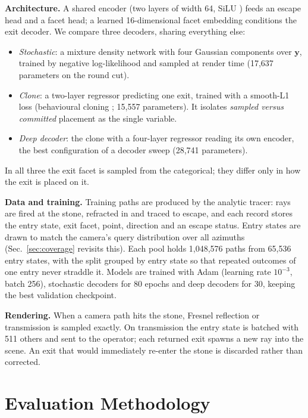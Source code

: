 \documentclass[conference]{IEEEtran}
\begin{document}
\textbf{Architecture.} A shared encoder (two layers of width 64, SiLU
\cite{elfwing2018}) feeds an escape head and a facet head; a learned
16-dimensional facet embedding conditions the exit decoder. We compare three
decoders, sharing everything else:
\begin{itemize}
\item \emph{Stochastic}: a mixture density network \cite{bishop1994} with four
Gaussian components over $\mathbf{y}$, trained by negative log-likelihood and
sampled at render time (17,637 parameters on the round cut).
\item \emph{Clone}: a two-layer regressor predicting one exit, trained with a
smooth-L1 loss (behavioural cloning \cite{pomerleau1989}; 15,557 parameters).
It isolates \emph{sampled versus committed} placement as the single variable.
\item \emph{Deep decoder}: the clone with a four-layer regressor reading its own
encoder, the best configuration of a decoder sweep (28,741 parameters).
\end{itemize}
In all three the exit facet is sampled from the categorical; they differ only in
how the exit is placed on it.

\textbf{Data and training.} Training paths are produced by the analytic tracer:
rays are fired at the stone, refracted in and traced to escape, and each record
stores the entry state, exit facet, point, direction and an escape status.
Entry states are drawn to match the camera's query distribution over all azimuths
(Sec.~\ref{sec:coverage} revisits this). Each pool holds 1,048,576 paths from
65,536 entry states, with the split grouped by entry state so that repeated
outcomes of one entry never straddle it. Models are trained with Adam
\cite{kingma2015} (learning rate $10^{-3}$, batch 256), stochastic decoders for 80
epochs and deep decoders for 30, keeping the best validation checkpoint.

\textbf{Rendering.} When a camera path hits the stone, Fresnel reflection or
transmission is sampled exactly. On transmission the entry state is batched with
511 others and sent to the operator; each returned exit spawns a new ray into
the scene. An exit that would immediately re-enter the stone is discarded rather
than corrected.

\section{Evaluation Methodology}
\label{sec:eval}
\end{document}
